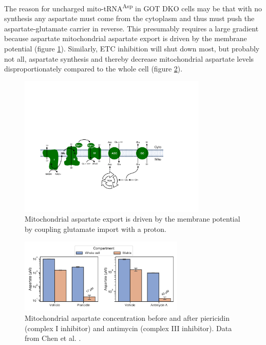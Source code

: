 \FloatBarrier
The reason for uncharged mito-tRNA\textsuperscript{Asp} in GOT DKO cells may be that with no synthesis any aspartate must come from the cytoplasm and thus must push the aspartate-glutamate carrier in reverse.
This presumably requires a large gradient because aspartate mitochondrial aspartate export is driven by the membrane potential (figure \ref{fig:sapp:tRNA:mito_asp_export}).
Similarly, ETC inhibition will shut down most, but probably not all, aspartate synthesis and thereby decrease mitochondrial aspartate levels disproportionately compared to the whole cell (figure \ref{fig:sapp:tRNA:mito_asp_levels}).

\begin{figure}[ht]
    \centering
    \includegraphics[width=0.8\textwidth]{figures/sapp/tRNA/mito_asp_export.pdf}
    \caption[Model of mitochondrial aspartate export]{
    Mitochondrial aspartate export is driven by the membrane potential by coupling glutamate import with a proton.
    }
    \label{fig:sapp:tRNA:mito_asp_export}
\end{figure}

\begin{figure}[ht]
    \centering
    \includegraphics[width=0.70\textwidth]{figures/sapp/tRNA/mito_asp_levels.pdf}
    \caption[Mitochondrial aspartate levels upon ETC inhibition]{
    Mitochondrial aspartate concentration before and after piericidin (complex I inhibitor) and antimycin (complex III inhibitor).
    Data from Chen et al. \cite{Chen2016-mf}.
    }
    \label{fig:sapp:tRNA:mito_asp_levels}
\end{figure}




